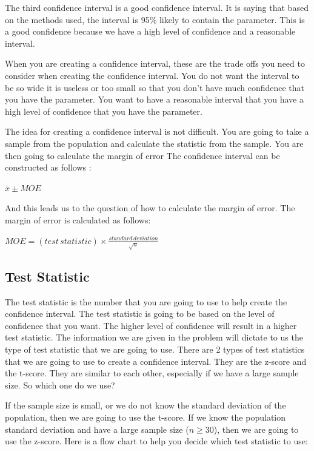 \documentclass[
  letterpaper,
  DIV=11,
  numbers=noendperiod]{scrreprt}
\begin{document}
The third confidence interval is a good confidence interval. It is
saying that based on the methods used, the interval is 95\% likely to
contain the parameter. This is a good confidence because we have a high
level of confidence and a reasonable interval.

When you are creating a confidence interval, these are the trade offs
you need to consider when creating the confidence interval. You do not
want the interval to be so wide it is useless or too small so that you
don't have much confidence that you have the parameter. You want to have
a reasonable interval that you have a high level of confidence that you
have the parameter.

The idea for creating a confidence interval is not difficult. You are
going to take a sample from the population and calculate the statistic
from the sample. You are then going to calculate the margin of error The
confidence interval can be constructed as follows :

\(\bar{x} \pm MOE\)

And this leads us to the question of how to calculate the margin of
error. The margin of error is calculated as follows:

\(\displaystyle{MOE = (test\,statistic) \times \frac{standard\,deviation}{\sqrt{n}}}\)

\subsection*{Test Statistic}\label{test-statistic}

The test statistic is the number that you are going to use to help
create the confidence interval. The test statistic is going to be based
on the level of confidence that you want. The higher level of confidence
will result in a higher test statistic. The information we are given in
the problem will dictate to us the type of test statistic that we are
going to use. There are 2 types of test statistics that we are going to
use to create a confidence interval. They are the z-score and the
t-score. They are similar to each other, especially if we have a large
sample size. So which one do we use?

If the sample size is small, or we do not know the standard deviation of
the population, then we are going to use the t-score. If we know the
population standard deviation and have a large sample size
(\(n \geq 30\)), then we are going to use the z-score. Here is a flow
chart to help you decide which test statistic to use:
\end{document}
